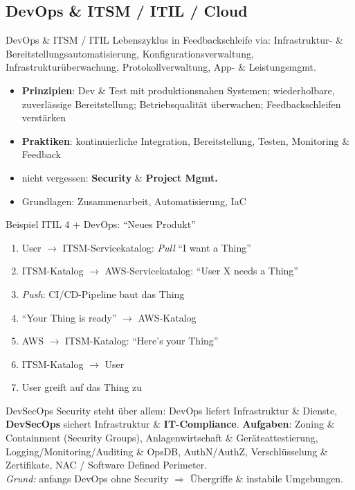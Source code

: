 \documentclass[a4paper, fontsize=7pt]{scrartcl}
\begin{document}
\subsection{DevOps \& ITSM / ITIL / Cloud}

\begin{mainbox}{DevOps \& ITSM / ITIL}
Lebenszyklus in Feedbackschleife via: Infrastruktur- \&
Bereitstellungsautomatisierung, Konfigurationsverwaltung,
Infrastrukturüberwachung, Protokollverwaltung, App- \& Leistungsmgmt.
\begin{itemize}
    \item \textbf{Prinzipien}: Dev \& Test mit produktionsnahen Systemen;
          wiederholbare, zuverlässige Bereitstellung; Betriebsqualität
          überwachen; Feedbackschleifen verstärken
    \item \textbf{Praktiken}: kontinuierliche Integration, Bereitstellung,
          Testen, Monitoring \& Feedback
    \item nicht vergessen: \textbf{Security} \& \textbf{Project Mgmt.}
    \item Grundlagen: Zusammenarbeit, Automatisierung, IaC
\end{itemize}
\end{mainbox}

\begin{subbox}{Beispiel ITIL 4 + DevOps: ``Neues Produkt''}
\begin{enumerate}
    \item User $\to$ ITSM-Servicekatalog: \emph{Pull} ``I want a Thing''
    \item ITSM-Katalog $\to$ AWS-Servicekatalog: ``User X needs a Thing''
    \item \emph{Push}: CI/CD-Pipeline baut das Thing
    \item ``Your Thing is ready'' $\to$ AWS-Katalog
    \item AWS $\to$ ITSM-Katalog: ``Here's your Thing''
    \item ITSM-Katalog $\to$ User
    \item User greift auf das Thing zu
\end{enumerate}
\end{subbox}

\begin{mainbox}{DevSecOps}
Security steht über allem: DevOps liefert Infrastruktur \& Dienste,
\textbf{DevSecOps} sichert Infrastruktur \& \textbf{IT-Compliance}.
\textbf{Aufgaben}: Zoning \& Containment (Security Groups),
Anlagenwirtschaft \& Geräteattestierung, Logging/Monitoring/Auditing \&
OpsDB, AuthN/AuthZ, Verschlüsselung \& Zertifikate, NAC / Software Defined
Perimeter.\\
\emph{Grund:} anfangs DevOps ohne Security $\Rightarrow$ Übergriffe \&
instabile Umgebungen.
\end{mainbox}
\end{document}
